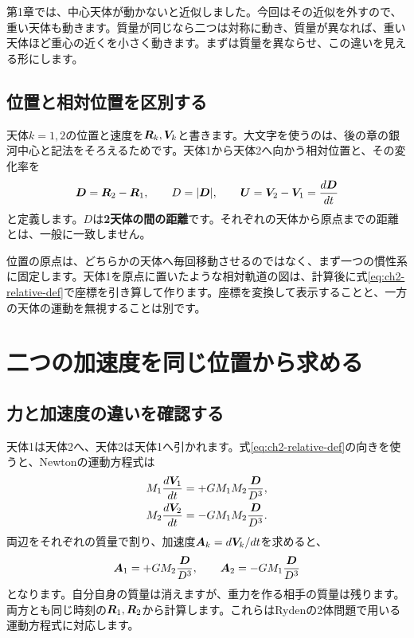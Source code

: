 第1章では、中心天体が動かないと近似しました。今回はその近似を外すので、重い天体も動きます。質量が同じなら二つは対称に動き、質量が異なれば、重い天体ほど重心の近くを小さく動きます。まずは質量を異ならせ、この違いを見える形にします。

\subsection{位置と相対位置を区別する}
天体$k=1,2$の位置と速度を$\boldsymbol R_k,\boldsymbol V_k$と書きます。大文字を使うのは、後の章の銀河中心と記法をそろえるためです。天体1から天体2へ向かう相対位置と、その変化率を
\begin{equation}
\boldsymbol D=\boldsymbol R_2-\boldsymbol R_1,\qquad D=|\boldsymbol D|,\qquad
\boldsymbol U=\boldsymbol V_2-\boldsymbol V_1=\frac{d\boldsymbol D}{dt}
\label{eq:ch2-relative-def}
\end{equation}
と定義します。$D$は\textbf{2天体の間の距離}です。それぞれの天体から原点までの距離とは、一般に一致しません。

位置の原点は、どちらかの天体へ毎回移動させるのではなく、まず一つの慣性系に固定します。天体1を原点に置いたような相対軌道の図は、計算後に式\eqref{eq:ch2-relative-def}で座標を引き算して作ります。座標を変換して表示することと、一方の天体の運動を無視することは別です。

\section{二つの加速度を同じ位置から求める}
\label{sec:ch2-force}
\subsection{力と加速度の違いを確認する}
天体1は天体2へ、天体2は天体1へ引かれます。式\eqref{eq:ch2-relative-def}の向きを使うと、Newtonの運動方程式は
\begin{align}
M_1\frac{d\boldsymbol V_1}{dt}&=+GM_1M_2\frac{\boldsymbol D}{D^3},\label{eq:ch2-force1}\\
M_2\frac{d\boldsymbol V_2}{dt}&=-GM_1M_2\frac{\boldsymbol D}{D^3}.\label{eq:ch2-force2}
\end{align}
両辺をそれぞれの質量で割り、加速度$\boldsymbol A_k=d\boldsymbol V_k/dt$を求めると、
\begin{equation}
\boldsymbol A_1=+GM_2\frac{\boldsymbol D}{D^3},\qquad
\boldsymbol A_2=-GM_1\frac{\boldsymbol D}{D^3}
\label{eq:ch2-acceleration}
\end{equation}
となります。自分自身の質量は消えますが、重力を作る相手の質量は残ります。両方とも同じ時刻の$\boldsymbol R_1,\boldsymbol R_2$から計算します。これらはRydenの2体問題で用いる運動方程式に対応します。\cite{ryden2025}

